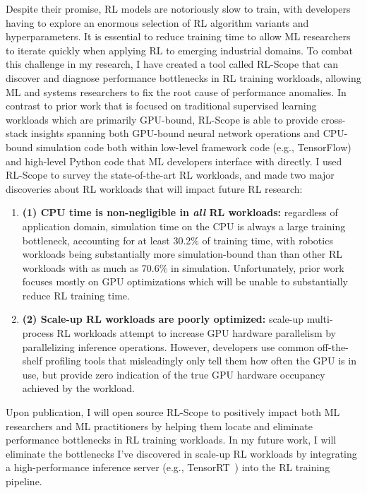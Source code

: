 \documentclass[letterpaper,11pt]{article}
\begin{document}
Despite their promise, RL models are notoriously slow to train, with developers having to explore an enormous selection of RL algorithm variants and hyperparameters.  It is essential to reduce training time to allow ML researchers to iterate quickly when applying RL to emerging industrial domains.  To combat this challenge in my research, I have created a tool called RL-Scope that can discover and diagnose performance bottlenecks in RL training workloads, allowing ML and systems researchers to fix the root cause of performance anomalies.
%
In contrast to prior work that is focused on traditional supervised learning workloads which are primarily GPU-bound, RL-Scope is able to provide cross-stack insights spanning both GPU-bound neural network operations and CPU-bound simulation code both within low-level framework code (e.g., TensorFlow) and high-level Python code that ML developers interface with directly.
%
I used RL-Scope to survey the state-of-the-art RL workloads, and made two major discoveries about RL workloads that will impact future RL research:
\begin{enumerate}
	\item \textbf{(1) CPU time is non-negligible in \textit{all} RL workloads:} 
        regardless of application domain, simulation time on the CPU is always a large training bottleneck, accounting 
        for at least 30.2\% of training time, with robotics workloads being substantially more simulation-bound than 
        than other RL workloads with as much as 70.6\% in simulation.  Unfortunately, prior work focuses mostly on 
        GPU optimizations which will be unable to substantially reduce RL training time.

        \item \textbf{(2) Scale-up RL workloads are poorly optimized:}
        scale-up multi-process RL workloads attempt to increase GPU hardware parallelism by parallelizing inference 
        operations.  However, developers use common off-the-shelf profiling tools that misleadingly only tell them how 
        often the GPU is in use, but provide zero indication of the true GPU hardware occupancy achieved by the workload.

\end{enumerate}
%
Upon publication, I will open source RL-Scope to positively impact both ML researchers and ML practitioners by helping 
them locate and eliminate performance bottlenecks in RL training workloads. In my future work, I will eliminate the 
bottlenecks I've discovered in scale-up RL workloads by integrating a high-performance inference server (e.g., 
TensorRT~\cite{tensorrt}) into the RL training pipeline.
\end{document}
